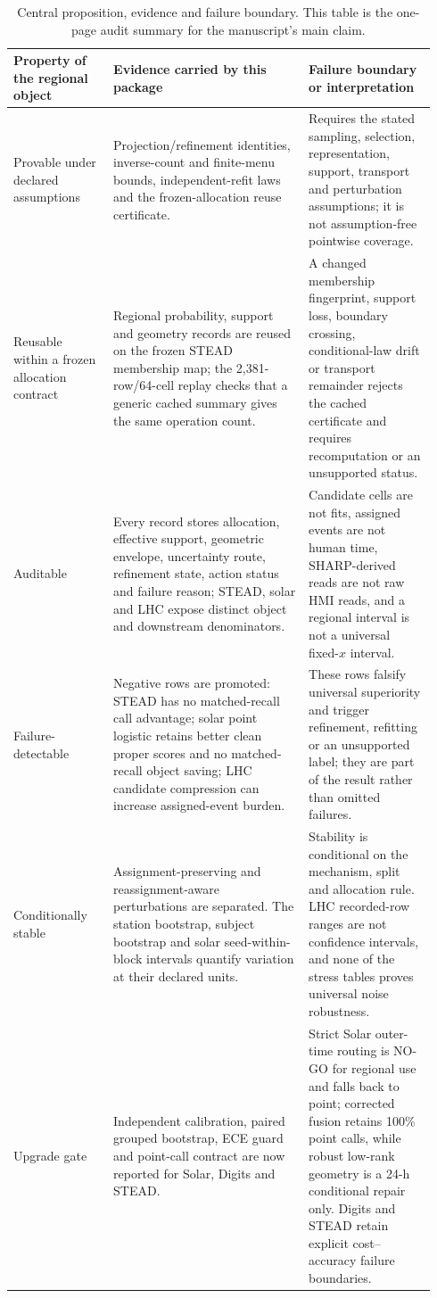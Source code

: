 \documentclass[11pt,a4paper]{article}
\numberwithin{equation}{section}
\theoremstyle{definition}\newtheorem{definition}[theorem]{Definition}
\theoremstyle{remark}\newtheorem{remark}[theorem]{Remark}
\begin{document}
\begin{table}[ht]
\centering\scriptsize
\caption{Central proposition, evidence and failure boundary. This table is the one-page audit summary for the manuscript's main claim.}
\begin{tabularx}{\linewidth}{@{}L{0.22\linewidth}L{0.43\linewidth}L{0.29\linewidth}@{}}
\toprule
Property of the regional object & Evidence carried by this package & Failure boundary or interpretation \\
\midrule
Provable under declared assumptions & Projection/refinement identities, inverse-count and finite-menu bounds, independent-refit laws and the frozen-allocation reuse certificate. & Requires the stated sampling, selection, representation, support, transport and perturbation assumptions; it is not assumption-free pointwise coverage. \\
Reusable within a frozen allocation contract & Regional probability, support and geometry records are reused on the frozen STEAD membership map; the 2,381-row/64-cell replay checks that a generic cached summary gives the same operation count. & A changed membership fingerprint, support loss, boundary crossing, conditional-law drift or transport remainder rejects the cached certificate and requires recomputation or an unsupported status. \\
Auditable & Every record stores allocation, effective support, geometric envelope, uncertainty route, refinement state, action status and failure reason; STEAD, solar and LHC expose distinct object and downstream denominators. & Candidate cells are not fits, assigned events are not human time, SHARP-derived reads are not raw HMI reads, and a regional interval is not a universal fixed-$x$ interval. \\
Failure-detectable & Negative rows are promoted: STEAD has no matched-recall call advantage; solar point logistic retains better clean proper scores and no matched-recall object saving; LHC candidate compression can increase assigned-event burden. & These rows falsify universal superiority and trigger refinement, refitting or an unsupported label; they are part of the result rather than omitted failures. \\
Conditionally stable & Assignment-preserving and reassignment-aware perturbations are separated. The station bootstrap, subject bootstrap and solar seed-within-block intervals quantify variation at their declared units. & Stability is conditional on the mechanism, split and allocation rule. LHC recorded-row ranges are not confidence intervals, and none of the stress tables proves universal noise robustness. \\
Upgrade gate & Independent calibration, paired grouped bootstrap, ECE guard and point-call contract are now reported for Solar, Digits and STEAD. & Strict Solar outer-time routing is NO-GO for regional use and falls back to point; corrected fusion retains 100\% point calls, while robust low-rank geometry is a 24-h conditional repair only. Digits and STEAD retain explicit cost--accuracy failure boundaries. \\
\bottomrule
\end{tabularx}
\end{table}
\end{document}
